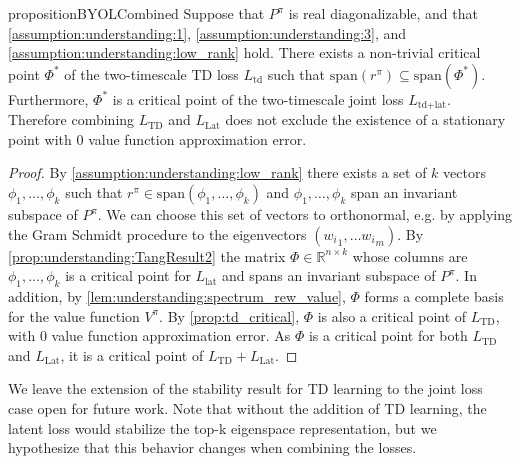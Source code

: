 \begin{restatable}{proposition}{BYOLCombined}\label{prop:understanding:BYOLCombined}
    Suppose that $P^\pi$ is real diagonalizable, and that \autoref{assumption:understanding:1}, \autoref{assumption:understanding:3}, and \autoref{assumption:understanding:low_rank} hold. 
    There exists a non-trivial critical point $\Phi^*$ of the two-timescale TD loss $L_\text{td}$ such that $\mathrm{span}(r^\pi)\subseteq \mathrm{span}(\Phi^*)$. 
    Furthermore, $\Phi^*$ is a critical point of the two-timescale joint loss $L_{\text{td}+\text{lat}}$. Therefore combining $L_\text{TD}$ and $L_\text{Lat}$ does not exclude the existence of a stationary point with $0$ value function approximation error.
\end{restatable}
\begin{proof}
        By \autoref{assumption:understanding:low_rank} there exists a set of $k$ vectors $\phi_1,\allowbreak \dots, \allowbreak \phi_k$ such that $r^\pi \in \text{span}(\phi_1,\allowbreak\dots,\allowbreak\phi_k)$ and $\phi_1,\dots,\phi_k$ span an invariant subspace of $P^\pi$.
        We can choose this set of vectors to orthonormal, e.g. by applying the Gram Schmidt procedure to the eigenvectors $({w_i}_1,\dots{w_i}_m)$. 
        By \autoref{prop:understanding:TangResult2} the matrix $\Phi\in \mathbb{R}^{n\times k}$ whose columns are $\phi_1,\dots,\phi_k$ is a critical point for $L_\text{lat}$ and spans an invariant subspace of $P^\pi$.
        In addition, by \autoref{lem:understanding:spectrum_rew_value}, $\Phi$ forms a complete basis for the value function $V^\pi$.
        By \autoref{prop:td_critical}, $\Phi$ is also a critical point of $L_\text{TD}$, with $0$ value function approximation error. 
        As $\Phi$ is a critical point for both $L_\text{TD}$ and $L_\text{Lat}$, it is a critical point of $L_\text{TD} + L_\text{Lat}$.
\end{proof}


We leave the extension of the stability result for TD learning to the joint loss case open for future work.
Note that without the addition of TD learning, the latent loss would stabilize the top-k eigenspace representation, but we hypothesize that this behavior changes when combining the losses.

